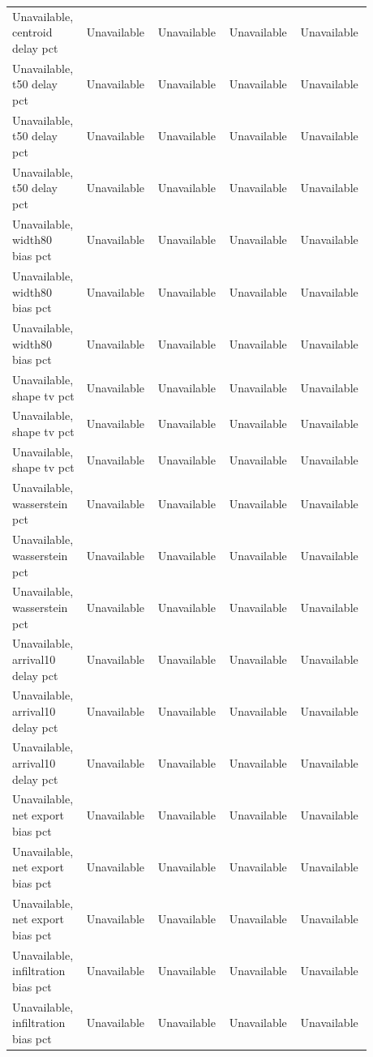 \begin{longtable}{p{0.1760\linewidth}p{0.1760\linewidth}p{0.1760\linewidth}p{0.1760\linewidth}p{0.1760\linewidth}}
Unavailable, centroid delay pct & Unavailable & Unavailable & Unavailable & Unavailable \\
Unavailable, t50 delay pct & Unavailable & Unavailable & Unavailable & Unavailable \\
Unavailable, t50 delay pct & Unavailable & Unavailable & Unavailable & Unavailable \\
Unavailable, t50 delay pct & Unavailable & Unavailable & Unavailable & Unavailable \\
Unavailable, width80 bias pct & Unavailable & Unavailable & Unavailable & Unavailable \\
Unavailable, width80 bias pct & Unavailable & Unavailable & Unavailable & Unavailable \\
Unavailable, width80 bias pct & Unavailable & Unavailable & Unavailable & Unavailable \\
Unavailable, shape tv pct & Unavailable & Unavailable & Unavailable & Unavailable \\
Unavailable, shape tv pct & Unavailable & Unavailable & Unavailable & Unavailable \\
Unavailable, shape tv pct & Unavailable & Unavailable & Unavailable & Unavailable \\
Unavailable, wasserstein pct & Unavailable & Unavailable & Unavailable & Unavailable \\
Unavailable, wasserstein pct & Unavailable & Unavailable & Unavailable & Unavailable \\
Unavailable, wasserstein pct & Unavailable & Unavailable & Unavailable & Unavailable \\
Unavailable, arrival10 delay pct & Unavailable & Unavailable & Unavailable & Unavailable \\
Unavailable, arrival10 delay pct & Unavailable & Unavailable & Unavailable & Unavailable \\
Unavailable, arrival10 delay pct & Unavailable & Unavailable & Unavailable & Unavailable \\
Unavailable, net export bias pct & Unavailable & Unavailable & Unavailable & Unavailable \\
Unavailable, net export bias pct & Unavailable & Unavailable & Unavailable & Unavailable \\
Unavailable, net export bias pct & Unavailable & Unavailable & Unavailable & Unavailable \\
Unavailable, infiltration bias pct & Unavailable & Unavailable & Unavailable & Unavailable \\
Unavailable, infiltration bias pct & Unavailable & Unavailable & Unavailable & Unavailable \\

\end{longtable}
